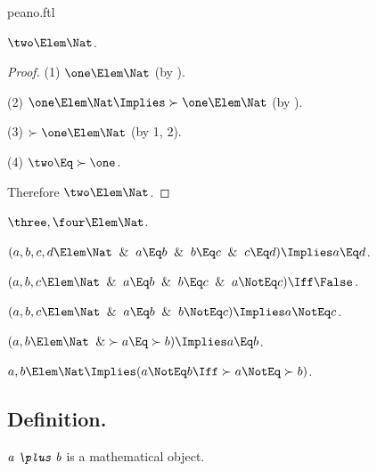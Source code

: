 \documentclass{stex}
\begin{document}
\begin{smodule}{peano.ftl}
\begin{forthel}
  \begin{theorem*}[title=11,name=P11]
    $\two \Elem \Nat$.
  \end{theorem*}
  \begin{proof}
    (1) $\one \Elem \Nat$ (by ).

    (2) $\one \Elem \Nat \Implies \succ{\one} \Elem \Nat$ (by ).

    (3) $\succ{\one} \Elem \Nat$ (by 1, 2).

    (4) $\two \Eq \succ{\one}$.

    Therefore $\two \Elem \Nat$.
  \end{proof}

  \begin{theorem*}[title=12,name=P12]
    $\three,\four \Elem \Nat$.
  \end{theorem*}

  \begin{theorem*}[title=13,name=P13]
    $(a,b,c,d \Elem \Nat \And a \Eq b \And b \Eq c \And c \Eq d) \Implies a \Eq d$.
  \end{theorem*}

  \begin{theorem*}[title=14,name=P14]
    $(a,b,c \Elem \Nat \And a \Eq b \And b \Eq c \And a \NotEq c) \Iff \False$.
  \end{theorem*}

  \begin{theorem*}[title=15,name=P15]
    $(a,b,c \Elem \Nat \And a \Eq b \And b \NotEq c) \Implies a \NotEq c$.
  \end{theorem*}

  \begin{theorem*}[title=16,name=P16]
    $(a,b \Elem \Nat \And \succ{a} \Eq \succ{b}) \Implies a \Eq b$.
  \end{theorem*}

  \begin{theorem*}[title=17,name=P17]
    $a,b \Elem \Nat \Implies (a \NotEq b \Iff \succ{a} \NotEq \succ{b})$.
  \end{theorem*}
\end{forthel}


\subsection{Definition.}


\begin{forthel}
  \begin{signature*}[for=plus]
    $\emph{a \plus b}$ is a mathematical object.
  \end{signature*}


\end{forthel}
\end{smodule}
\end{document}
